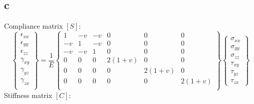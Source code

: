 \subsection{c}
Compliance matrix $[S]$:
\begin{equation}
    \begin{Bmatrix}
        \epsilon_{xx} \\
        \epsilon_{yy} \\
        \epsilon_{zz} \\
        \gamma_{xy}   \\
        \gamma_{yz}   \\
        \gamma_{zx}   \\
    \end{Bmatrix} = \frac{1}{E}
    \begin{Bmatrix}
        1  & -v & -v & 0      & 0      & 0      \\
        -v & 1  & -v & 0      & 0      & 0      \\
        -v & -v & 1  & 0      & 0      & 0      \\
        0  & 0  & 0  & 2(1+v) & 0      & 0      \\
        0  & 0  & 0  & 0      & 2(1+v) & 0      \\
        0  & 0  & 0  & 0      & 0      & 2(1+v) \\
    \end{Bmatrix}
    \begin{Bmatrix}
        \sigma_{xx} \\
        \sigma_{yy} \\
        \sigma_{zz} \\
        \tau_{xy}   \\
        \tau_{yz}   \\
        \tau_{zx}
    \end{Bmatrix}
\end{equation}
Stiffness matrix $[C]$:
